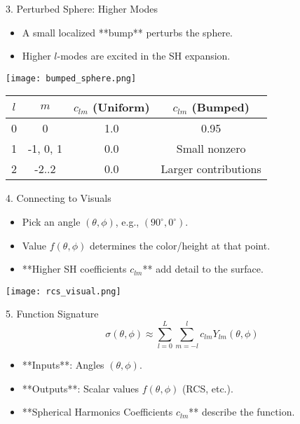 \documentclass{beamer}
\begin{document}
\begin{frame}{3. Perturbed Sphere: Higher Modes}
    \begin{itemize}
        \item A small localized **bump** perturbs the sphere.
        \item Higher \( l \)-modes are excited in the SH expansion.
    \end{itemize}
    \vspace{0.3cm}
    \begin{center}
        \texttt{[image: bumped\_sphere.png]} %
    \end{center}
    \vspace{0.3cm}
    \begin{tabular}{|c|c|c|c|}
        \hline
        \( l \) & \( m \) & \( c_{lm} \) (Uniform) & \( c_{lm} \) (Bumped) \\
        \hline
        0       & 0       & 1.0                  & 0.95                  \\
        1       & -1, 0, 1 & 0.0                 & Small nonzero         \\
        2       & -2..2   & 0.0                  & Larger contributions  \\
        \hline
    \end{tabular}
\end{frame}

\begin{frame}{4. Connecting to Visuals}
    \begin{itemize}
        \item Pick an angle \( (\theta, \phi) \), e.g., \( (90^\circ, 0^\circ) \).
        \item Value \( f(\theta, \phi) \) determines the color/height at that point.
        \item **Higher SH coefficients \( c_{lm} \)** add detail to the surface.
    \end{itemize}
    \vspace{0.3cm}
    \begin{center}
        \texttt{[image: rcs\_visual.png]} %
    \end{center}
\end{frame}

\begin{frame}{5. Function Signature}
    \[
    \sigma(\theta, \phi) \approx \sum_{l=0}^L \sum_{m=-l}^l c_{lm} Y_{lm}(\theta, \phi)
    \]
    \begin{itemize}
        \item **Inputs**: Angles \( (\theta, \phi) \).
        \item **Outputs**: Scalar values \( f(\theta, \phi) \) (RCS, etc.).
        \item **Spherical Harmonics Coefficients \( c_{lm} \)** describe the function.
    \end{itemize}
\end{frame}
\end{document}
